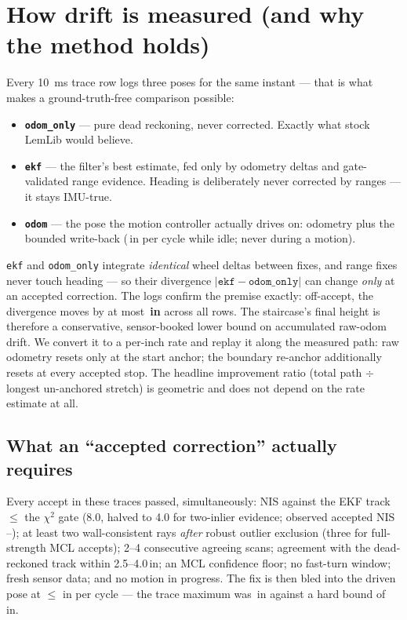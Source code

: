 \documentclass[11pt]{article}
\begin{document}
\section{How drift is measured (and why the method holds)}
Every \SI{10}{ms} trace row logs three poses for the same instant --- that is what
makes a ground-truth-free comparison possible:
\begin{itemize}
  \item[\textcolor{drift}{\faCircle}] \textbf{\texttt{odom\_only}} --- pure dead
  reckoning, never corrected. Exactly what stock LemLib would believe.
  \item[\textcolor{filt}{\faCircle}] \textbf{\texttt{ekf}} --- the filter's best
  estimate, fed only by odometry deltas and gate-validated range evidence. Heading
  is deliberately never corrected by ranges --- it stays IMU-true.
  \item[\textcolor{subink}{\faCircle}] \textbf{\texttt{odom}} --- the pose the
  motion controller actually drives on: odometry plus the bounded write-back
  (\contCap\,in per cycle while idle; never during a motion).
\end{itemize}
\texttt{ekf} and \texttt{odom\_only} integrate \emph{identical} wheel deltas between
fixes, and range fixes never touch heading --- so their divergence
$\lvert\texttt{ekf}-\texttt{odom\_only}\rvert$ can change \emph{only} at an accepted
correction. The logs confirm the premise exactly: off-accept, the divergence moves by
at most \textbf{\AuditStairMax\,in} across all \nTotalRows{} rows. The staircase's
final height is therefore a conservative, sensor-booked lower bound on accumulated
raw-odom drift. We convert it to a per-inch rate and replay it along the measured
path: raw odometry resets only at the start anchor; the boundary re-anchor
additionally resets at every accepted stop. The headline improvement ratio
(total path $\div$ longest un-anchored stretch) is geometric and does not depend on
the rate estimate at all.

\subsection{What an ``accepted correction'' actually requires}
Every accept in these traces passed, simultaneously: NIS against the EKF track
$\leq$ the $\chi^2$ gate (8.0, halved to 4.0 for two-inlier evidence; observed
accepted NIS \AcceptNisMin--\AcceptNisMax); at least two wall-consistent rays
\emph{after} robust outlier exclusion (three for full-strength MCL accepts);
2--4 consecutive agreeing scans; agreement with the dead-reckoned track within
\numrange{2.5}{4.0}\,in; an MCL confidence floor; no fast-turn window; fresh sensor
data; and no motion in progress. The fix is then bled into the driven pose at
$\leq$\,\contCap\,in per cycle --- the trace maximum was \AuditCapObserved\,in
against a hard bound of \AuditCapBound\,in.
\end{document}
